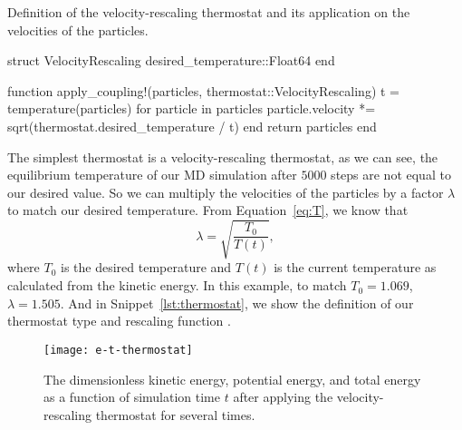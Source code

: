 \begin{algorithm}[H]
    \caption{Definition of the velocity-rescaling thermostat and its application
        on the velocities of the particles.}
    \label{lst:thermostat}
    \begin{juliacode}
        struct VelocityRescaling
            desired_temperature::Float64
        end

        function apply_coupling!(particles, thermostat::VelocityRescaling)
            t = temperature(particles)
            for particle in particles
                particle.velocity *= sqrt(thermostat.desired_temperature / t)
            end
            return particles
        end
    \end{juliacode}
\end{algorithm}

The simplest thermostat is a velocity-rescaling thermostat, as we can see, the equilibrium
temperature of our MD simulation after \(5000\) steps are not equal to our desired value.
So we can multiply the velocities of the particles by a factor \(\lambda\) to match our
desired temperature.
From Equation~\ref{eq:T}, we know that
%
\begin{equation}
    \lambda = \sqrt{\frac{ T_0 }{ T(t) }},
\end{equation}
%
where \(T_0\) is the desired temperature and \(T(t)\) is the current temperature as
calculated from the kinetic energy.
In this example, to match \(T_0 = 1.069\), \(\lambda = 1.505\).
And in Snippet~\ref{lst:thermostat}, we show the definition of our thermostat type
 and rescaling function .

\begin{figure}[H]
    \centering
    \texttt{[image: e-t-thermostat]}
    \caption{The dimensionless kinetic energy, potential energy, and total energy
        as a function of simulation time \(t\) after applying the velocity-rescaling
        thermostat for several times.}
    \label{fig:md-thermostat}
\end{figure}

